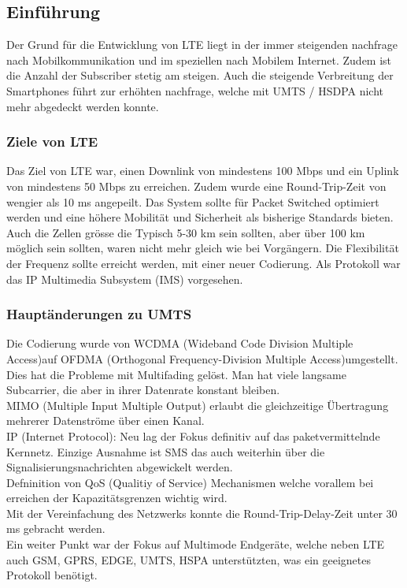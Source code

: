 \subsection{Einführung}
Der Grund für die Entwicklung von LTE liegt in der immer steigenden nachfrage nach Mobilkommunikation und im speziellen nach Mobilem Internet. Zudem ist die Anzahl der Subscriber stetig am steigen. Auch die steigende Verbreitung der Smartphones führt zur erhöhten nachfrage, welche mit UMTS / HSDPA nicht mehr abgedeckt werden konnte. \\
\subsubsection{Ziele von LTE}
Das Ziel von LTE war, einen Downlink von mindestens 100 Mbps und ein Uplink von mindestens 50 Mbps zu erreichen. Zudem wurde eine Round-Trip-Zeit von wengier als 10 ms angepeilt. Das System sollte für Packet Switched optimiert werden und eine höhere Mobilität und Sicherheit als bisherige Standards bieten. Auch die Zellen grösse die Typisch 5-30 km sein sollten, aber über 100 km möglich sein sollten, waren nicht mehr gleich wie bei Vorgängern. Die Flexibilität der Frequenz sollte erreicht werden, mit einer neuer Codierung. Als Protokoll war das IP Multimedia Subsystem (IMS) vorgesehen.

\subsubsection{Hauptänderungen zu UMTS}
Die Codierung wurde von WCDMA (Wideband Code Division Multiple Access)auf OFDMA (Orthogonal Frequency-Division Multiple Access)umgestellt. Dies hat die Probleme mit Multifading gelöst. Man hat viele langsame Subcarrier, die aber in ihrer Datenrate konstant bleiben. \\
MIMO (Multiple Input Multiple Output) erlaubt die gleichzeitige Übertragung mehrerer Datenströme über einen Kanal.\\
IP (Internet Protocol): Neu lag der Fokus definitiv auf das paketvermittelnde Kernnetz. Einzige Ausnahme ist SMS das auch weiterhin über die Signalisierungsnachrichten abgewickelt werden. \\
Defninition von QoS (Qualitiy of Service)  Mechanismen welche vorallem bei erreichen der Kapazitätsgrenzen wichtig wird. \\
Mit der Vereinfachung des Netzwerks konnte die Round-Trip-Delay-Zeit unter 30 ms gebracht werden. \\
Ein weiter Punkt war der Fokus auf Multimode Endgeräte, welche neben LTE auch GSM, GPRS, EDGE, UMTS, HSPA unterstützten, was ein geeignetes Protokoll benötigt.


